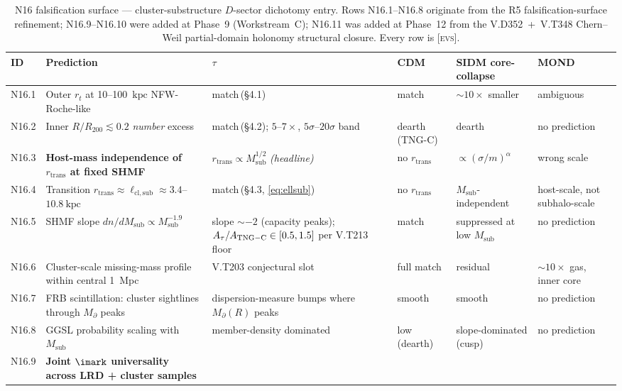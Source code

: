 \documentclass{pantarhei-researchnote}
\newcommand{\ellsub}{\ell_{\mathrm{cl},\mathrm{sub}}}  %
\newcommand{\Mpa}{M_{\partial}}                 %
\newcommand{\Msub}{M_{\mathrm{sub}}}
\newcommand{\Rtwohun}{R_{200}}
\newcommand{\kpc}{\mathrm{kpc}}
\newcommand{\rtran}{r_{\mathrm{trans}}}
\newcommand{\evstag}{\textsc{[evs]}}
\newcommand{\falsifierID}[1]{\textsc{N16.#1}}
\renewcommand{\arraystretch}{1.2}
\begin{document}
\begin{table}[!t]
\footnotesize
\centering
\renewcommand{\arraystretch}{1.15}
\caption{N16 falsification surface — cluster-substructure $D$-sector
dichotomy entry. Rows \falsifierID{1}--\falsifierID{8} originate from the
R5 falsification-surface refinement; \falsifierID{9}--\falsifierID{10}
were added at Phase~9 (Workstream~C); \falsifierID{11} was added at
Phase~12 from the V.D352~+~V.T348 Chern--Weil partial-domain holonomy
structural closure. Every row is \evstag{}.}
\label{tab:n16}
\begin{tabular}{@{}p{0.6cm} p{4.8cm} p{3.6cm} p{1.6cm} p{2.6cm} p{1.7cm}@{}}
\toprule
ID & Prediction & $\tau$ & CDM & SIDM core-collapse & MOND \\
\midrule
\falsifierID{1} & Outer $r_t$ at 10--100~$\kpc$ NFW-Roche-like
  & match\,(\S{}4.1)
  & match
  & $\sim 10\times$ smaller
  & ambiguous \\
\falsifierID{2} & Inner $R/\Rtwohun \lesssim 0.2$ \emph{number} excess
  & match\,(\S{}4.2); $5$--$7\times$, $5\sigma$--$20\sigma$ band
  & dearth (TNG-C)
  & dearth
  & no prediction \\
\falsifierID{3} & \textbf{Host-mass independence of $\rtran$ at fixed SHMF}
  & $\rtran \propto \Msub^{1/2}$ \emph{(headline)}
  & no $\rtran$
  & $\propto (\sigma/m)^{\alpha}$
  & wrong scale \\
\falsifierID{4} & Transition $\rtran \approx \ellsub \approx 3.4$--$10.8~\kpc$
  & match\,(\S{}4.3, \eqref{eq:ellsub})
  & no $\rtran$
  & $\Msub$-independent
  & host-scale, not subhalo-scale \\
\falsifierID{5} & SHMF slope $dn/d\Msub \propto \Msub^{-1.9}$
  & slope $\sim -2$ (capacity peaks);
    $A_\tau/A_{\rm TNG-C} \in [0.5, 1.5]$ per V.T213 floor
  & match
  & suppressed at low $\Msub$
  & no prediction \\
\falsifierID{6} & Cluster-scale missing-mass profile within central 1~Mpc
  & V.T203 conjectural slot~\cite{KSZCategorical}
  & full match
  & residual
  & $\sim 10\times$ gas, inner core~\cite{Famaey2025} \\
\falsifierID{7} & FRB scintillation: cluster sightlines through $\Mpa$ peaks
  & dispersion-measure bumps where $\Mpa(R)$ peaks
  & smooth
  & smooth
  & no prediction \\
\falsifierID{8} & GGSL probability scaling with $\Msub$
  & member-density dominated
  & low (dearth)
  & slope-dominated (cusp)
  & no prediction \\
\falsifierID{9} & \textbf{Joint $\imark$ universality across LRD + cluster samples}

\end{tabular}
\end{table}
\end{document}
